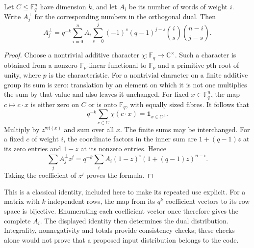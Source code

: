 \begin{theorem}\label{ULCD.MacWilliams}
Let $C\leq\mathbb F_q^n$ have dimension $k$, and let $A_i$ be its number
of words of weight $i$. Write $A_j^\perp$ for the corresponding numbers
in the orthogonal dual. Then
\[
 A_j^\perp=q^{-k}\sum_{i=0}^n A_i
 \sum_{s=0}^j(-1)^s(q-1)^{j-s}
                 \binom is\binom{n-i}{j-s}.
\]
\end{theorem}
\begin{proof}
Choose a nontrivial additive character
$\chi:\mathbb F_q\to\mathbb C^\times$. Such a character is obtained
from a nonzero $\mathbb F_p$-linear functional to $\mathbb F_p$ and a
primitive $p$th root of unity, where $p$ is the characteristic.
For a nontrivial character on a finite additive group its sum is zero:
translation by an element on which it is not one multiplies the sum by
that value and also leaves it unchanged.
For fixed $x\in\mathbb F_q^n$, the map $c\mapsto c\cdot x$ is either
zero on $C$ or is onto $\mathbb F_q$, with equally sized fibres.
It follows that
\[
 q^{-k}\sum_{c\in C}\chi(c\cdot x)=\mathbf1_{x\in C^\perp}.
\]
Multiply by $z^{\mathrm{wt}(x)}$ and sum over all $x$. The finite sums
may be interchanged. For a fixed $c$ of weight $i$, the coordinate factors
in the inner sum are $1+(q-1)z$ at its zero entries and $1-z$ at its
nonzero entries. Hence
\[
 \sum_j A_j^\perp z^j
 =q^{-k}\sum_i A_i(1-z)^i(1+(q-1)z)^{n-i}.
\]
Taking the coefficient of $z^j$ proves the formula.
\end{proof}

This is a classical identity, included here to make its repeated use
explicit. For a matrix with $k$ independent rows, the map from its
$q^k$ coefficient vectors to its row space is bijective. Enumerating
each coefficient vector once therefore gives the complete $A_i$.
The displayed identity then determines the dual distribution. Integrality,
nonnegativity and totals provide consistency checks; these checks alone
would not prove that a proposed input distribution belongs to the code.
